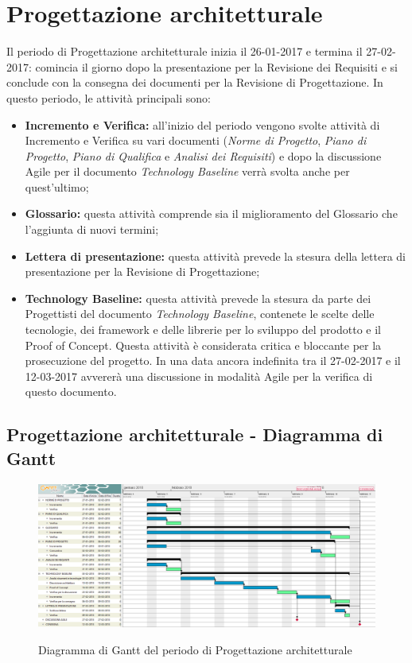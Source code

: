 \documentclass[PianoDiProgetto.tex]{subfiles}
\begin{document}
\section{Progettazione architetturale}
Il periodo di Progettazione architetturale inizia il 26-01-2017 e termina il 27-02-2017: comincia il giorno dopo la presentazione per la Revisione dei Requisiti e si conclude con la consegna dei documenti per la Revisione di Progettazione. In questo periodo, le attività principali sono:
\begin{itemize}
	\item \textbf{Incremento e Verifica:} all'inizio del periodo vengono svolte attività di Incremento e Verifica su vari documenti (\textit{Norme di Progetto}, \textit{Piano di Progetto}, \textit{Piano di Qualifica} e \textit{Analisi dei Requisiti}) e dopo la discussione Agile per il documento \textit{Technology Baseline} verrà svolta anche per quest'ultimo;
	\item \textbf{Glossario:} questa attività comprende sia il miglioramento del Glossario che l'aggiunta di nuovi termini;
	\item \textbf{Lettera di presentazione:} questa attività prevede la stesura della lettera di presentazione per la Revisione di Progettazione;
	\item \textbf{Technology Baseline:} questa attività prevede la stesura da parte dei Progettisti del documento \textit{Technology Baseline}, contenete le scelte delle tecnologie, dei framework e delle librerie per lo sviluppo del prodotto e il Proof of Concept. Questa attività è considerata critica e bloccante per la prosecuzione del progetto. In una data ancora indefinita tra il 27-02-2017 e il 12-03-2017 avvererà una discussione in modalità Agile per la verifica di questo documento.
\end{itemize}

\begin{landscape}
	\subsection{Progettazione architetturale - Diagramma di Gantt}
	\begin{figure}[ht]
		\includegraphics[width=19cm]{images/gantt/progArch.png}
		\label{fig:foo}
		\caption{Diagramma di Gantt del periodo di Progettazione architetturale}
	\end{figure}	
\end{landscape}
\end{document}
